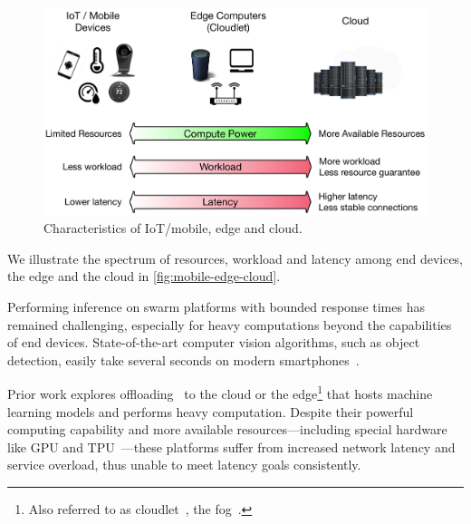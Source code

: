 


\begin{figure}
  \centering
  \includegraphics[width=0.8\columnwidth]{figures/background.pdf}
  \caption{Characteristics of IoT/mobile, edge and cloud.}
  \label{fig:mobile-edge-cloud}
\end{figure}

We illustrate the spectrum of resources, workload and latency among end devices,
the edge and the cloud in \autoref{fig:mobile-edge-cloud}.

Performing inference on swarm platforms with bounded response times has remained
challenging, especially for heavy computations beyond the capabilities of end
devices. State-of-the-art computer vision algorithms, such as object detection,
easily take several seconds on modern smartphones~\cite{chen2015glimpse}.

Prior work explores offloading~\cite{chun2011clonecloud,cuervo2010maui} to the
cloud or the edge\footnote{Also referred to as
  cloudlet~\cite{satyanarayanan2009case}, the fog~\cite{bonomi2012fog}.}  that
hosts machine learning models and performs heavy computation. Despite their
powerful computing capability and more available resources---including special
hardware like GPU and TPU~\cite{jouppi2017datacenter}---these platforms suffer
from increased network latency and service overload, thus unable to meet latency
goals consistently.

